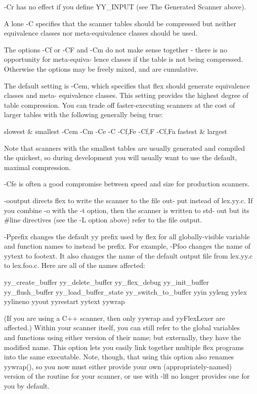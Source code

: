 \documentclass[12pt,spanish,twocolumn,lettersize]{article}
\begin{document}
{	      -Cr  has	no effect if you define YY_INPUT (see The
	      Generated Scanner above).

	      A lone -C specifies that the scanner tables  should
	      be  compressed  but neither equivalence classes nor
	      meta-equivalence classes should be used.

	      The options -Cf or -CF and -Cm do	 not  make  sense
	      together - there is no opportunity for meta-equiva-
	      lence classes if the table is not being compressed.
	      Otherwise	 the options may be freely mixed, and are
	      cumulative.

	      The default setting is -Cem, which  specifies  that
	      flex  should generate equivalence classes and meta-
	      equivalence classes.   This  setting  provides  the
	      highest degree of table compression.  You can trade
	      off faster-executing scanners at the cost of larger
	      tables with the following generally being true:

		  slowest & smallest
			-Cem
			-Cm
			-Ce
			-C
			-C{f,F}e
			-C{f,F}
			-C{f,F}a
		  fastest & largest

	      Note  that  scanners  with  the smallest tables are
	      usually generated and  compiled  the  quickest,  so
	      during development you will usually want to use the
	      default, maximal compression.

	      -Cfe is often a good compromise between  speed  and
	      size for production scanners.

       -ooutput
	      directs  flex to write the scanner to the file out-
	      put instead of lex.yy.c.	If you	combine	 -o  with
	      the  -t option, then the scanner is written to std-
	      out but its #line directives  (see  the  -L  option
	      above) refer to the file output.

       -Pprefix
	      changes  the default yy prefix used by flex for all
	      globally-visible variable	 and  function	names  to
	      instead  be prefix.  For example, -Pfoo changes the
	      name of yytext to footext.   It  also  changes  the
	      name  of	the  default output file from lex.yy.c to
	      lex.foo.c.  Here are all of the names affected:

		  yy_create_buffer
		  yy_delete_buffer
		  yy_flex_debug
		  yy_init_buffer
		  yy_flush_buffer
		  yy_load_buffer_state
		  yy_switch_to_buffer
		  yyin
		  yyleng
		  yylex
		  yylineno
		  yyout
		  yyrestart
		  yytext
		  yywrap

	      (If you are using a C++ scanner, then  only  yywrap
	      and yyFlexLexer are affected.)  Within your scanner
	      itself, you can still refer to the global variables
	      and  functions  using either version of their name;
	      but externally, they have the modified name.
	      This option lets you easily link together	 multiple
	      flex  programs  into  the	 same  executable.  Note,
	      though,  that  using  this  option   also	  renames
	      yywrap(),	 so  you now must either provide your own
	      (appropriately-named) version of	the  routine  for
	      your  scanner,  or use %
	      with  -lfl  no  longer  provides	one  for  you  by
	      default.

}
\end{document}

